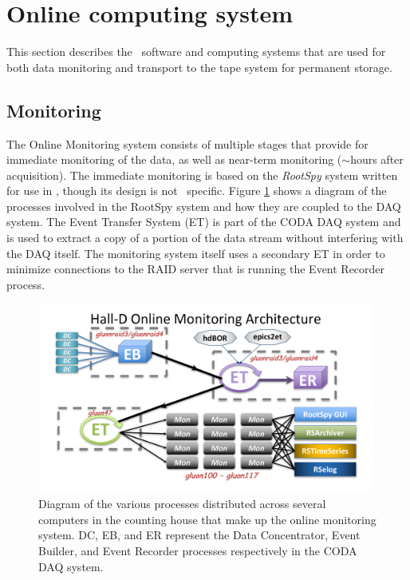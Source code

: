 
\section[Online computing system]{Online computing system \label{sec:online}}

This section describes the \GX ~software and computing systems that are used for both data monitoring and transport to the tape system for permanent storage.

\subsection{Monitoring \label{sec:onlinemonitoring}}

The Online Monitoring system consists of multiple stages that provide for immediate monitoring of the data, as well as near-term monitoring ($\sim$hours after acquisition). The immediate monitoring is based on the \textit{RootSpy} system\cite{rootspy} written for use in \GX, though its design is not \GX ~specific. Figure \ref{fig:online_monitoring_processes} shows a diagram of the processes involved in the RootSpy system and how they are coupled to the DAQ system. The Event Transfer System (ET) is part of the CODA DAQ system\cite{coda} and is used to extract a copy of a portion of the data stream without interfering with the DAQ itself. The monitoring system itself uses a secondary ET in order to minimize connections to the RAID server that is running the Event Recorder process.

\begin{figure}[tbp]
\begin{center}
\includegraphics[width=0.99\textwidth, clip,trim=1.5cm 0.9cm 1.7cm 0.8cm]{figures/online_monitoring_processes.pdf}
\caption{\label{fig:online_monitoring_processes}Diagram of the various processes distributed across several computers in the counting house that make up the online monitoring system. DC, EB, and ER represent the Data Concentrator, Event Builder, and Event Recorder processes respectively in the CODA DAQ system.}   
\end{center}  
\end{figure}

